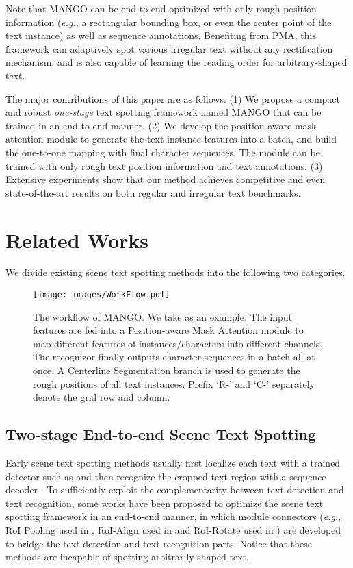 \documentclass[letterpaper]{article} \usepackage{aaai21}  \usepackage{times}  \usepackage{helvet} \usepackage{courier}  \usepackage[hyphens]{url}  \usepackage{graphicx} \urlstyle{rm} \def\UrlFont{\rm}  \usepackage{natbib}  \usepackage{caption} \frenchspacing  \setlength{\pdfpagewidth}{8.5in}  \setlength{\pdfpageheight}{11in}  \usepackage{multirow}
\begin{document}
Note that MANGO can be end-to-end optimized with only rough position information (\emph{e.g.}, a rectangular bounding box, or even the center point of the text instance) as well as sequence annotations.
Benefiting from PMA, this framework can adaptively spot various irregular text without any rectification mechanism, and is also capable of learning the reading order for arbitrary-shaped text.

The major contributions of this paper are as follows:
(1) We propose a compact and robust \emph{one-stage} text spotting framework named MANGO that can be trained in an end-to-end manner.
(2) We develop the position-aware mask attention module to generate the text instance features into a batch, and build the one-to-one mapping with final character sequences.
The module can be trained with only rough text position information and text annotations.
(3) Extensive experiments show that our method achieves competitive and even state-of-the-art results on both regular and irregular text benchmarks.

\section{Related Works}
We divide existing scene text spotting methods into the following two categories.
\begin{figure*}[th!]
\begin{center}
\texttt{[image: images/WorkFlow.pdf]}\\
\end{center}
\caption{The workflow of MANGO. We take  as an example. The input features are fed into a Position-aware Mask Attention module to map different features of instances/characters into different channels. The recognizor finally outputs character sequences in a batch all at once. A Centerline Segmentation branch is used to generate the rough positions of all text instances. Prefix `R-' and `C-' separately denote the grid row and column.}
\label{framework}
\end{figure*}
\subsection{Two-stage End-to-end Scene Text Spotting}
Early scene text spotting methods \cite{liao2018textboxess,liao2017textboxes,wang2012end} usually first localize each text with a trained detector such as \cite{liao2017textboxes,zhou2017east,he2017single,ma2018arbitrary,xu2019textfield,baek2019character} and then recognize the cropped text region with a sequence decoder \cite{shi2016robust,shi2017end,cheng2017focus,zhan2019esir,luo2019moran}.
To sufficiently exploit the complementarity between text detection and text recognition, some works have been proposed to optimize the scene text spotting framework in an end-to-end manner, in which module connectors (\emph{e.g.}, RoI Pooling \cite{ren2015faster} used in \cite{li2017towards,wang2019towards}, RoI-Align used in \cite{he2018end} and RoI-Rotate used in \cite{liu2018fots}) are developed to bridge the text detection and text recognition parts.
Notice that these methods are incapable of spotting arbitrarily shaped text.
\end{document}
